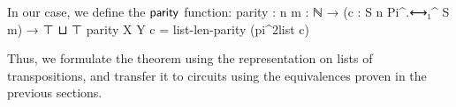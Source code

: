 In our case, we define the $\operatorname{\mathsf{parity}}$ function:
parity : {n m : ℕ} → (c : S n Pi^.⟷₁^ S m) → ⊤ ⊔ ⊤
parity {X} {Y} c = list-len-parity (pi^2list c)

Thus, we formulate the theorem using the representation on lists of transpositions, and transfer it to circuits using
the equivalences proven in the previous sections.







